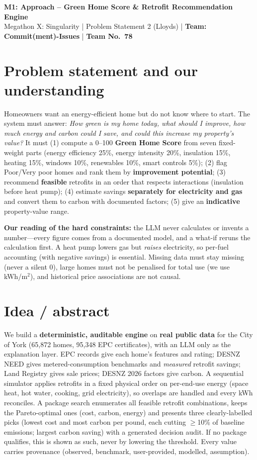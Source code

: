 \documentclass[10pt,a4paper]{article}
\begin{document}
\begin{center}
{\Large\bfseries M1: Approach -- Green Home Score \& Retrofit Recommendation Engine}\\[3pt]
Megathon X: Singularity \;|\; Problem Statement 2 (Lloyds) \;|\; \textbf{Team: Commit(ment)-Issues} \;|\; \textbf{Team No.\ 78}
\end{center}
\vspace{-6pt}

\section{Problem statement and our understanding}
Homeowners want an energy-efficient home but do not know where to start. The system must answer: \emph{How green is my
home today, what should I improve, how much energy and carbon could I save, and could this increase my property's value?}
It must (1) compute a 0--100 \textbf{Green Home Score} from seven fixed-weight parts (energy efficiency 25\%, energy
intensity 20\%, insulation 15\%, heating 15\%, windows 10\%, renewables 10\%, smart controls 5\%); (2) flag Poor/Very
poor homes and rank them by \textbf{improvement potential}; (3) recommend \textbf{feasible} retrofits in an order that
respects interactions (insulation before heat pump); (4) estimate savings \textbf{separately for electricity and gas}
and convert them to carbon with documented factors; (5) give an \textbf{indicative} property-value range.

\textbf{Our reading of the hard constraints:} the LLM never calculates or invents a number---every figure comes from a
documented model, and a what-if reruns the calculation first. A heat pump lowers gas but \emph{raises} electricity, so
per-fuel accounting (with negative savings) is essential. Missing data must stay missing (never a silent 0), large homes
must not be penalised for total use (we use kWh/m$^2$), and historical price associations are not causal.

\section{Idea / abstract}
We build a \textbf{deterministic, auditable engine} on \textbf{real public data} for the City of York (65,872 homes,
95,348 EPC certificates), with an LLM only as the explanation layer. EPC records give each home's features and rating;
DESNZ NEED gives metered-consumption benchmarks and \emph{measured} retrofit savings; Land Registry gives sale prices;
DESNZ 2026 factors give carbon. A sequential simulator applies retrofits in a fixed physical order on per-end-use energy
(space heat, hot water, cooking, grid electricity), so overlaps are handled and every kWh reconciles. A package search
enumerates all feasible retrofit combinations, keeps the Pareto-optimal ones (cost, carbon, energy) and presents three
clearly-labelled picks (lowest cost and most carbon per pound, each cutting $\ge$10\% of baseline emissions; largest
carbon saving) with a generated decision audit. If no package qualifies, this is shown as such, never by lowering the threshold. Every value carries provenance (observed, benchmark, user-provided, modelled, assumption).
\end{document}
